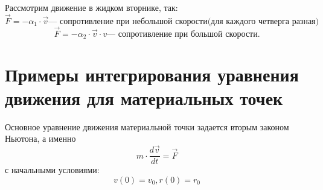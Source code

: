 \documentclass[12pt,a4paper]{report}
\begin{document}
\begin{enumerate}
\begin{itemize}
                    \vspace{5px}

                    Рассмотрим движение в жидком вторнике, так:
                    \[ \vec F =  - \alpha_1 \cdot \vec v \text{--- сопротивление при небольшой скорости(для каждого четверга разная)}\]
                    \[ \vec F =  - \alpha_2 \cdot \vec v \cdot v \text{--- сопротивление при большой скорости.}\]
          \end{itemize}
\end{enumerate}
\section{Примеры интегрирования уравнения движения для материальных точек}

Основное уравнение движения материальной точки задается вторым законом Ньютона, а именно \[ m \cdot \frac{d\vec v}{dt} = \vec F\] с начальными условиями: \[ v(0) = v_0, r(0) = r_0\]
\end{document}
